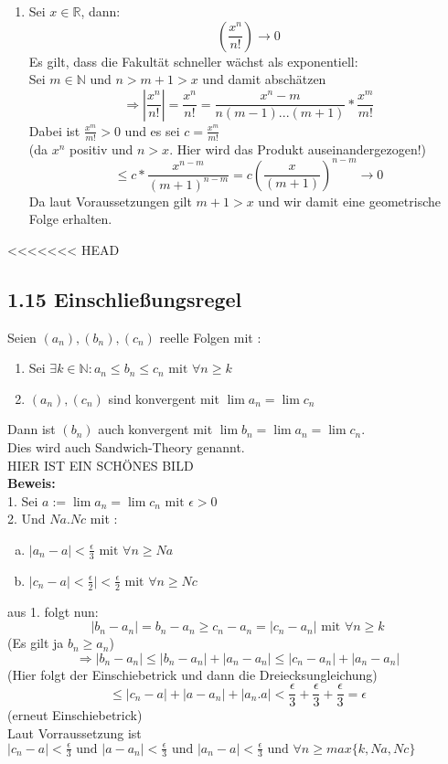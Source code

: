 \documentclass[12pt]{article}
\begin{document}
\begin{enumerate}[\bfseries a)]
	\item Sei $x \in \mathbb{R}$, dann:
	$$(\frac{x^n}{n!}) \rightarrow 0 $$
	Es gilt, dass die Fakultät schneller wächst als exponentiell:\\
	Sei $m \in \mathbb{N}$ und $n>m+1>x$ und damit abschätzen
	$$ \Rightarrow |\frac{x^n}{n!}| = \frac{x^n}{n!} = \frac{x^n -m}{n(m-1)...(m+1)}*\frac{x^m}{m!}$$
	Dabei ist $\frac{x^m}{m!}>0$ und es sei $c=\frac{x^m}{m!}$\\
	(da $x^n$ positiv und $n>x$. Hier wird das Produkt auseinandergezogen!)\\
	$$\leq c* \frac{x^{n-m}}{(m+1)^{n-m}}= c(\frac{x}{(m+1)})^{n-m} \rightarrow 0$$
	Da laut Voraussetzungen gilt $m+1>x$ und wir damit eine geometrische Folge erhalten. 
\end{enumerate}
<<<<<<< HEAD


\subsection*{1.15 Einschließungsregel}
Seien $(a_n), (b_n), (c_n)$ reelle Folgen mit :
\begin{enumerate}
 \item  Sei $ \exists k \in \mathbb{N}: a_n \leq b_n \leq c_n \text{  mit  } \forall n \geq k$
 \item $(a_n),(c_n)$ sind konvergent mit $\lim a_n = \lim c_n$
\end{enumerate}
Dann ist $(b_n)$ auch konvergent mit $\lim b_n = \lim a_n = \lim c_n$.\\
Dies wird auch Sandwich-Theory genannt. \\
HIER IST EIN SCHÖNES BILD\\

\textbf{Beweis: }\\
1. Sei $a:= \lim a_n = \lim c_n \text{  mit  } \epsilon > 0$\\
2. Und $Na. Nc$ mit : \begin{enumerate}[a)] \item $| a_n - a| < \frac{\epsilon}{3} \text{  mit  } \forall n \geq Na $\\
								\item $ |c_n - a| < \frac{\epsilon}{2}| < \frac{\epsilon}{2}\text{  mit  } \forall n \geq Nc$
							\end{enumerate}
aus 1. folgt nun:\\
$$|b_n - a_n| = b_n - a_n \geq c_n - a_n = |c_n - a_n| \text{  mit  } \forall n \geq k$$
(Es gilt ja $b_n \geq a_n$)\\
$$\Rightarrow |b_n - a_n| \leq |b_n- a_n| + |a_n- a_n| \leq |c_n - a_n| + |a_n - a_n|$$
(Hier folgt der Einschiebetrick und dann die Dreiecksungleichung)\\
$$ \leq |c_n - a| + |a - a_n| + |a_n . a | < \frac{\epsilon}{3} + \frac{\epsilon}{3}  +\frac{\epsilon}{3} = \epsilon$$
(erneut Einschiebetrick)\\
Laut Vorraussetzung ist $|c_n - a| < \frac{\epsilon}{3} \text{ und } |a - a_n| < \frac{\epsilon}{3} \text{ und } |a_n -a| < \frac{\epsilon}{3} \text{  und  } \forall n \geq max\{k, Na, Nc\}$
\end{document}
